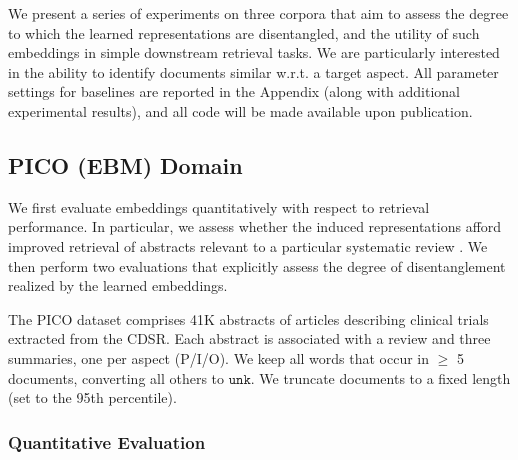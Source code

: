 \documentclass[11pt,a4paper]{article}
\begin{document}
We present a series of experiments on three corpora that aim to assess the degree to which the learned representations are disentangled, and the utility of such embeddings in simple downstream retrieval tasks. We are particularly interested in the ability to identify documents similar w.r.t. a target aspect. All parameter settings for baselines are reported in the Appendix (along with additional experimental results), and all code will be made available upon publication.

\vspace{-.5em}
\subsection{PICO (EBM) Domain}
\label{section:PICO}
\vspace{-.25em}

We first evaluate embeddings quantitatively with respect to retrieval performance. In particular, we assess whether the induced representations afford improved retrieval of abstracts relevant to a particular systematic review \cite{cohen2006reducing,wallace2010semi}. We then perform two evaluations that explicitly assess the degree of disentanglement realized by the learned embeddings.

The PICO dataset comprises 41K abstracts of articles describing clinical trials extracted from the CDSR. Each abstract is associated with a review and three summaries, one per aspect (P/I/O). We keep all words that occur in $\geq$ 5 documents, converting all others to $\texttt{unk}$. We truncate documents to a fixed length (set to the 95th percentile). 




\vspace{-.1em}
\subsubsection{Quantitative Evaluation}
\vspace{-.25em}
\end{document}
